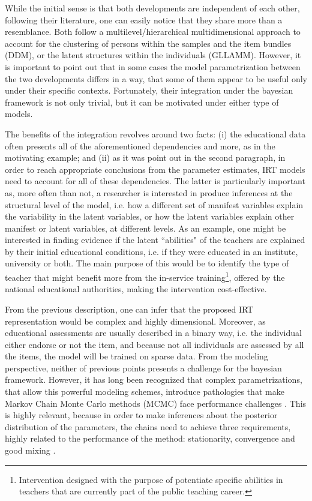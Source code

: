 While the initial sense is that both developments are independent of each other, following their literature, one can easily notice that they share more than a resemblance. Both follow a multilevel/hierarchical multidimensional approach to account for the clustering of persons within the samples and the item bundles (DDM), or the latent structures within the individuals (GLLAMM). However, it is important to point out that in some cases the model parametrization between the two developments differs in a way, that some of them appear to be useful only under their specific contexts. Fortunately, their integration under the bayesian framework is not only trivial, but it can be motivated under either type of models.

The benefits of the integration revolves around two facts: (i) the educational data often presents all of the aforementioned dependencies and more, as in the motivating example; and (ii) as it was point out in the second paragraph, in order to reach appropriate conclusions from the parameter estimates, IRT models need to account for all of these dependencies. The latter is particularly important as, more often than not, a researcher is interested in produce inferences at the structural level of the model, i.e. how a different set of manifest variables explain the variability in the latent variables, or how the latent variables explain other manifest or latent variables, at different levels. As an example, one might be interested in finding evidence if the latent ``abilities" of the teachers are explained by their initial educational conditions, i.e. if they were educated in an institute, university or both. The main purpose of this would be to identify the type of teacher that might benefit more from the in-service training\footnote{Intervention designed with the purpose of potentiate specific abilities in teachers that are currently part of the public teaching career.}, offered by the national educational authorities, making the intervention cost-effective.

From the previous description, one can infer that the proposed IRT representation would be complex and highly dimensional. Moreover, as educational assessments are usually described in a binary way, i.e. the individual either endorse or not the item, and because not all individuals are assessed by all the items, the model will be trained on sparse data. From the modeling perspective, neither of previous points presents a challenge for the bayesian framework. However, it has long been recognized that complex parametrizations, that allow this powerful modeling schemes, introduce pathologies that make Markov Chain Monte Carlo methods (MCMC)  face performance challenges \cite{Gelfand_et_al_1995, Gelfand_et_al_1996, Papaspiliopoulos_et_al_2003, Papaspiliopoulos_et_al_2007, Betancourt_et_al_2013}. This is highly relevant, because in order to make inferences about the posterior distribution of the parameters, the chains need to achieve three requirements, highly related to the performance of the method: stationarity, convergence and good mixing \cite{McElreath_2020}.

